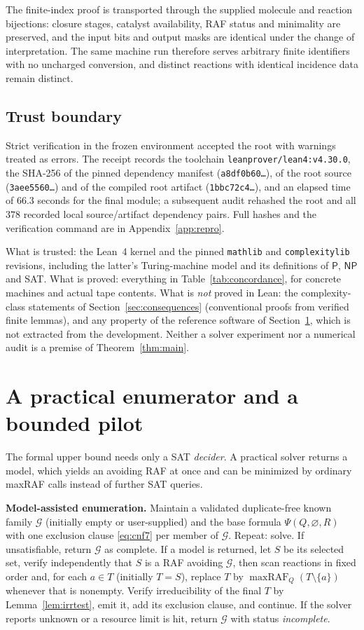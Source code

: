 \documentclass[11pt,a4paper]{article}
\theoremstyle{plain}
\theoremstyle{definition}
\theoremstyle{remark}
\newcommand{\maxRAF}{\operatorname{maxRAF}}
\newcommand{\PP}{\mathsf P}
\newcommand{\NP}{\mathsf{NP}}
\newcommand{\cG}{\mathcal G}
\begin{document}
The finite-index proof is transported through the supplied molecule and reaction bijections: closure stages, catalyst availability, RAF status and minimality are preserved, and the input bits and output masks are identical under the change of interpretation. The same machine run therefore serves arbitrary finite identifiers with no uncharged conversion, and distinct reactions with identical incidence data remain distinct.

\subsection{Trust boundary}

Strict verification in the frozen environment accepted the root with warnings treated as errors. The receipt records the toolchain \texttt{leanprover/lean4:v4.30.0}, the SHA-256 of the pinned dependency manifest (\texttt{a8df0b60\ldots}), of the root source (\texttt{3aee5560\ldots}) and of the compiled root artifact (\texttt{1bbc72c4\ldots}), and an elapsed time of $66.3$ seconds for the final module; a subsequent audit rehashed the root and all $378$ recorded local source/artifact dependency pairs. Full hashes and the verification command are in Appendix~\ref{app:repro}.

What is trusted: the Lean~4 kernel and the pinned \texttt{mathlib} and \texttt{complexitylib} revisions, including the latter's Turing-machine model and its definitions of $\PP$, $\NP$ and SAT. What is proved: everything in Table~\ref{tab:concordance}, for concrete machines and actual tape contents. What is \emph{not} proved in Lean: the complexity-class statements of Section~\ref{sec:consequences} (conventional proofs from verified finite lemmas), and any property of the reference software of Section~\ref{sec:practice}, which is not extracted from the development. Neither a solver experiment nor a numerical audit is a premise of Theorem~\ref{thm:main}.

\section{A practical enumerator and a bounded pilot}\label{sec:practice}

The formal upper bound needs only a SAT \emph{decider}. A practical solver returns a model, which yields an avoiding RAF at once and can be minimized by ordinary maxRAF calls instead of further SAT queries.

\medskip
\noindent\textbf{Model-assisted enumeration.} Maintain a validated duplicate-free known family $\cG$ (initially empty or user-supplied) and the base formula $\Psi(Q,\varnothing,R)$ with one exclusion clause \eqref{eq:cnf7} per member of $\cG$. Repeat: solve. If unsatisfiable, return $\cG$ as complete. If a model is returned, let $S$ be its selected set, verify independently that $S$ is a RAF avoiding $\cG$, then scan reactions in fixed order and, for each $a\in T$ (initially $T=S$), replace $T$ by $\maxRAF_Q(T\setminus\{a\})$ whenever that is nonempty. Verify irreducibility of the final $T$ by Lemma~\ref{lem:irrtest}, emit it, add its exclusion clause, and continue. If the solver reports unknown or a resource limit is hit, return $\cG$ with status \emph{incomplete}.
\end{document}
